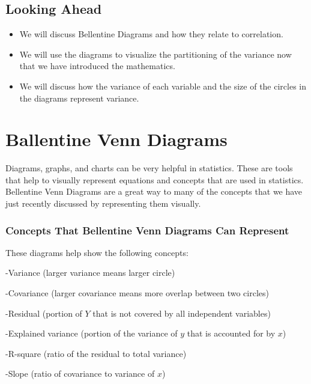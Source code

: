 \documentclass[]{book}
\theoremstyle{definition}
\theoremstyle{definition}
\theoremstyle{definition}
\theoremstyle{remark}
\begin{document}
\hypertarget{looking-ahead-2}{%
\section{Looking Ahead}\label{looking-ahead-2}}

\begin{itemize}
\item
  We will discuss Bellentine Diagrams and how they relate to
  correlation.
\item
  We will use the diagrams to visualize the partitioning of the variance
  now that we have introduced the mathematics.
\item
  We will discuss how the variance of each variable and the size of the
  circles in the diagrams represent variance.
\end{itemize}

\hypertarget{ballentine-venn-diagrams}{%
\chapter{Ballentine Venn Diagrams}\label{ballentine-venn-diagrams}}

Diagrams, graphs, and charts can be very helpful in statistics. These
are tools that help to visually represent equations and concepts that
are used in statistics. Bellentine Venn Diagrams are a great way to many
of the concepts that we have just recently discussed by representing
them visually.

\hypertarget{concepts-that-bellentine-venn-diagrams-can-represent}{%
\subsection{Concepts That Bellentine Venn Diagrams Can
Represent}\label{concepts-that-bellentine-venn-diagrams-can-represent}}

These diagrams help show the following concepts:

-Variance (larger variance means larger circle)

-Covariance (larger covariance means more overlap between two circles)

-Residual (portion of \(Y\) that is not covered by all independent
variables)

-Explained variance (portion of the variance of \(y\) that is accounted
for by \(x\))

-R-square (ratio of the residual to total variance)

-Slope (ratio of covariance to variance of \(x\))
\end{document}
